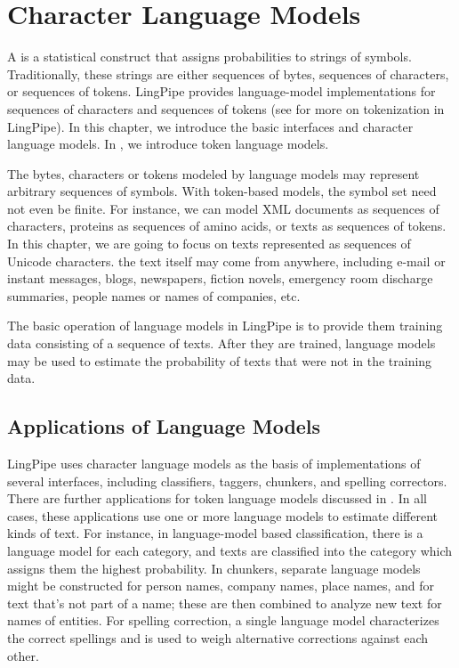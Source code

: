 \chapter{Character Language Models}\label{chap:char-lm}

A  is a statistical construct that assigns
probabilities to strings of symbols.  Traditionally, these strings are
either sequences of bytes, sequences of characters, or sequences of
tokens.  LingPipe provides language-model implementations for
sequences of characters and sequences of tokens (see
 for more on tokenization in LingPipe).  In this
chapter, we introduce the basic interfaces and character language
models.  In , we introduce token language models.

The bytes, characters or tokens modeled by language models may
represent arbitrary sequences of symbols.  With token-based models,
the symbol set need not even be finite. For instance, we can model XML
documents as sequences of characters, proteins as sequences of amino
acids, or texts as sequences of tokens.  In this chapter, we are going
to focus on texts represented as sequences of Unicode characters.  the
text itself may come from anywhere, including e-mail or instant
messages, blogs, newspapers, fiction novels, emergency room discharge
summaries, people names or names of companies, etc.

The basic operation of language models in LingPipe is to provide them
training data consisting of a sequence of texts.  After they are
trained, language models may be used to estimate the probability of
texts that were not in the training data.  

\section{Applications of Language Models}\label{section:char-lm-apps}

LingPipe uses character language models as the basis of
implementations of several interfaces, including classifiers, taggers,
chunkers, and spelling correctors.  There are further applications for
token language models discussed in .  In all cases,
these applications use one or more language models to estimate
different kinds of text.  For instance, in language-model based
classification, there is a language model for each category, and texts
are classified into the category which assigns them the highest
probability.  In chunkers, separate language models might be
constructed for person names, company names, place names, and for text
that's not part of a name; these are then combined to analyze new text
for names of entities.  For spelling correction, a single language
model characterizes the correct spellings and is used to weigh
alternative corrections against each other.

